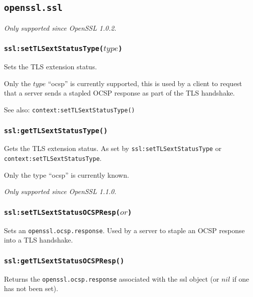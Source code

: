\documentclass[11pt, oneside]{memoir}
\newcommand*{\fn}[1]{\texttt{#1}\xspace}
\newcommand*{\module}[1]{\texttt{#1}\xspace}
\newcounter{toccols}
\newenvironment{Module}[1]{
	\subsection{\texttt{#1}}
	\addtocontents{toc}{
		\protect\begin{multicols}{\value{toccols}}
	}
}{
	\addtocontents{toc}{\protect\end{multicols}}
}
\begin{document}
\begin{Module}{openssl.ssl}
\emph{Only supported since OpenSSL 1.0.2.}

\subsubsection[\fn{ssl:setTLSextStatusType}]{\fn{ssl:setTLSextStatusType($type$)}}

Sets the TLS extension status.

Only the $type$ ``ocsp'' is currently supported, this is used by a client to request that a server sends a stapled OCSP response as part of the TLS handshake.

See also: \fn{context:setTLSextStatusType()}

\subsubsection[\fn{ssl:getTLSextStatusType}]{\fn{ssl:getTLSextStatusType()}}

Gets the TLS extension status. As set by \fn{ssl:setTLSextStatusType} or \fn{context:setTLSextStatusType}.

Only the type ``ocsp'' is currently known.

\emph{Only supported since OpenSSL 1.1.0.}

\subsubsection[\fn{ssl:setTLSextStatusOCSPResp}]{\fn{ssl:setTLSextStatusOCSPResp($or$)}}

Sets an \module{openssl.ocsp.response}. Used by a server to staple an OCSP response into a TLS handshake.

\subsubsection[\fn{ssl:getTLSextStatusOCSPResp}]{\fn{ssl:getTLSextStatusOCSPResp()}}

Returns the \module{openssl.ocsp.response} associated with the ssl object (or $nil$ if one has not been set).

\end{Module}
\end{document}
